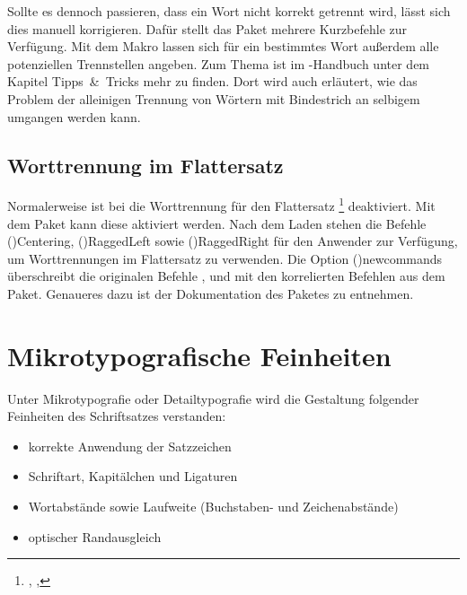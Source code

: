 \documentclass[%
  english,ngerman,%
  cdgeometry=no,DIV=12,%
  cd=false,cdfont=false,cdtitle=true,%
  headings=normal,%
  automark,%
  listof=toc,%
]{tudscrartcl}
\begin{document}
Sollte es dennoch passieren, dass ein Wort nicht korrekt getrennt wird, lässt
sich dies manuell korrigieren. Dafür stellt das Paket  mehrere 
Kurzbefehle zur Verfügung. Mit dem Makro  lassen sich für 
ein bestimmtes Wort außerdem alle potenziellen Trennstellen angeben. Zum Thema 
ist im \TUDScript-Handbuch unter dem Kapitel Tipps~\&~Tricks mehr zu finden. 
Dort wird auch erläutert, wie das Problem der alleinigen Trennung von Wörtern 
mit Bindestrich an selbigem umgangen werden kann.



\subsection{Worttrennung im Flattersatz}

Normalerweise ist bei  die Worttrennung für den Flattersatz%
\footnote{, , } 
deaktiviert. Mit dem Paket  kann diese aktiviert werden. Nach 
dem Laden stehen die Befehle \Macro(){Centering}, 
\Macro(){RaggedLeft} sowie 
\Macro(){RaggedRight} für den Anwender zur Verfügung, um 
Worttrennungen im Flattersatz zu verwenden. Die Option 
\Option(){newcommands} überschreibt die originalen Befehle 
,  und  mit den 
korrelierten Befehlen aus dem Paket. Genaueres dazu ist der Dokumentation des 
Paketes zu entnehmen.



\section{Mikrotypografische Feinheiten}

Unter Mikrotypografie oder Detailtypografie wird die Gestaltung folgender 
Feinheiten des Schriftsatzes verstanden:
\begin{itemize}[noitemsep]
\item korrekte Anwendung der Satzzeichen
\item Schriftart, Kapitälchen und Ligaturen
\item Wortabstände sowie Laufweite (Buchstaben- und Zeichenabstände)
\item optischer Randausgleich
\end{itemize}
\end{document}
